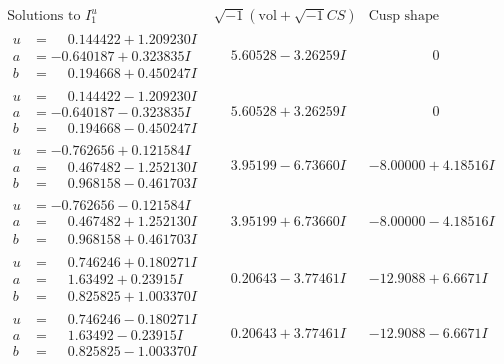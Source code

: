 \documentclass[1p]{elsarticle_modified}
\theoremstyle{definition}
\newcommand{\I}{\sqrt{-1}}
\begin{document}
$$\begin{array}{c|c|c}
\text{Solutions to }I^u_{1}& \I (\text{vol} + \sqrt{-1}CS) & \text{Cusp shape}\\
 \hline 
\begin{aligned}
u &= \phantom{-}0.144422 + 1.209230 I \\
a &= -0.640187 + 0.323835 I \\
b &= \phantom{-}0.194668 + 0.450247 I\end{aligned}
 & \phantom{-}5.60528 - 3.26259 I & \phantom{-0.000000 } 0 \\ \hline\begin{aligned}
u &= \phantom{-}0.144422 - 1.209230 I \\
a &= -0.640187 - 0.323835 I \\
b &= \phantom{-}0.194668 - 0.450247 I\end{aligned}
 & \phantom{-}5.60528 + 3.26259 I & \phantom{-0.000000 } 0 \\ \hline\begin{aligned}
u &= -0.762656 + 0.121584 I \\
a &= \phantom{-}0.467482 - 1.252130 I \\
b &= \phantom{-}0.968158 - 0.461703 I\end{aligned}
 & \phantom{-}3.95199 - 6.73660 I & -8.00000 + 4.18516 I \\ \hline\begin{aligned}
u &= -0.762656 - 0.121584 I \\
a &= \phantom{-}0.467482 + 1.252130 I \\
b &= \phantom{-}0.968158 + 0.461703 I\end{aligned}
 & \phantom{-}3.95199 + 6.73660 I & -8.00000 - 4.18516 I \\ \hline\begin{aligned}
u &= \phantom{-}0.746246 + 0.180271 I \\
a &= \phantom{-}1.63492 + 0.23915 I \\
b &= \phantom{-}0.825825 + 1.003370 I\end{aligned}
 & \phantom{-}0.20643 - 3.77461 I & -12.9088 + 6.6671 I \\ \hline\begin{aligned}
u &= \phantom{-}0.746246 - 0.180271 I \\
a &= \phantom{-}1.63492 - 0.23915 I \\
b &= \phantom{-}0.825825 - 1.003370 I\end{aligned}
 & \phantom{-}0.20643 + 3.77461 I & -12.9088 - 6.6671 I \\ \hline\begin{aligned}

\end{aligned}
\end{array}$$
\end{document}
